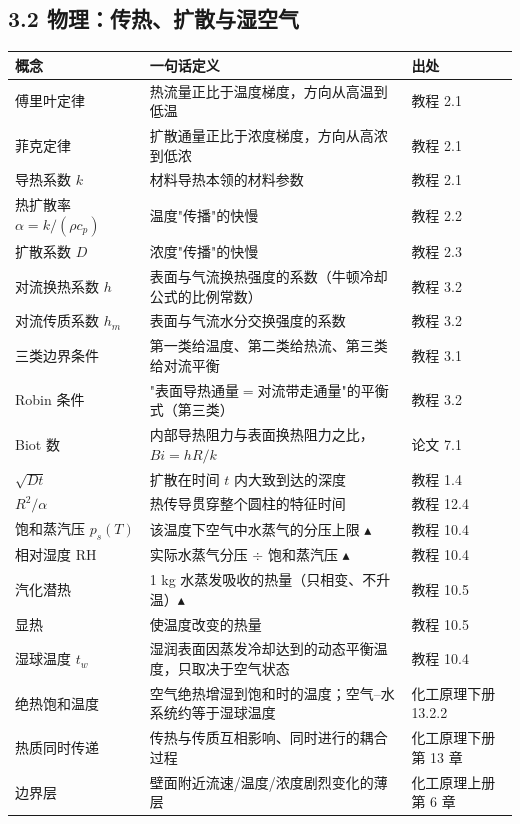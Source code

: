 \documentclass[12pt,a4paper]{ctexart}
\begin{document}
\subsection{3.2 物理：传热、扩散与湿空气}

\begin{center}
{\begin{tabular}{p{2.7cm}p{8.3cm}p{3.4cm}}
\toprule
概念 & 一句话定义 & 出处 \\
\midrule
傅里叶定律 & 热流量正比于温度梯度，方向从高温到低温 & 教程 2.1 \\
菲克定律 & 扩散通量正比于浓度梯度，方向从高浓到低浓 & 教程 2.1 \\
导热系数 $k$ & 材料导热本领的材料参数 & 教程 2.1 \\
热扩散率 $\alpha=k/(\rho c_p)$ & 温度"传播"的快慢 & 教程 2.2 \\
扩散系数 $D$ & 浓度"传播"的快慢 & 教程 2.3 \\
对流换热系数 $h$ & 表面与气流换热强度的系数（牛顿冷却公式的比例常数） & 教程 3.2 \\
对流传质系数 $h_m$ & 表面与气流水分交换强度的系数 & 教程 3.2 \\
三类边界条件 & 第一类给温度、第二类给热流、第三类给对流平衡 & 教程 3.1 \\
Robin 条件 & "表面导热通量$=$对流带走通量"的平衡式（第三类） & 教程 3.2 \\
Biot 数 & 内部导热阻力与表面换热阻力之比，$Bi=hR/k$ & 论文 7.1 \\
$\sqrt{Dt}$ & 扩散在时间 $t$ 内大致到达的深度 & 教程 1.4 \\
$R^2/\alpha$ & 热传导贯穿整个圆柱的特征时间 & 教程 12.4 \\
饱和蒸汽压 $p_s(T)$ & 该温度下空气中水蒸气的分压上限 $\blacktriangle$ & 教程 10.4 \\
相对湿度 RH & 实际水蒸气分压 $\div$ 饱和蒸汽压 $\blacktriangle$ & 教程 10.4 \\
汽化潜热 & 1 kg 水蒸发吸收的热量（只相变、不升温）$\blacktriangle$ & 教程 10.5 \\
显热 & 使温度改变的热量 & 教程 10.5 \\
湿球温度 $t_w$ & 湿润表面因蒸发冷却达到的动态平衡温度，只取决于空气状态 & 教程 10.4 \\
绝热饱和温度 & 空气绝热增湿到饱和时的温度；空气--水系统约等于湿球温度 & 化工原理下册 13.2.2 \\
热质同时传递 & 传热与传质互相影响、同时进行的耦合过程 & 化工原理下册第 13 章 \\
边界层 & 壁面附近流速/温度/浓度剧烈变化的薄层 & 化工原理上册第 6 章 \\
\bottomrule
\end{tabular}}
\end{center}
\end{document}

